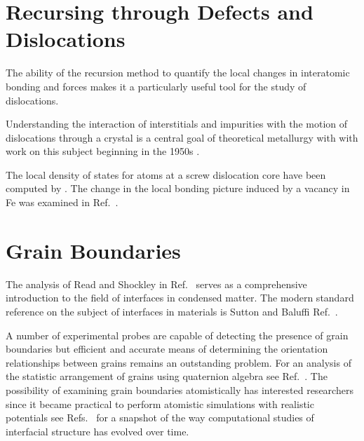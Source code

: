 
\section{Recursing through Defects and Dislocations}
The ability of the recursion method to quantify the local changes in interatomic bonding and
forces makes it a particularly useful tool for the study of dislocations. 

Understanding the interaction of interstitials and impurities with the motion of
dislocations through a crystal is a central goal of theoretical metallurgy with
with work on this subject beginning in the 1950s \cite{cochardt55}.

The local density of states for atoms at a screw dislocation core have been computed by \cite{paidar81,masuda81}. 
The change in the local bonding picture induced by a vacancy in Fe was examined in Ref.~\cite{masuda82,ohta87}.

\section{Grain Boundaries}
The analysis of Read and Shockley in Ref.~\cite{read50} serves as a comprehensive
introduction to the field of interfaces in condensed matter. The modern
standard reference on the subject of interfaces in materials is Sutton and 
Baluffi Ref.~\cite{sutton95}.

A number of experimental probes are capable of detecting the presence of 
grain boundaries but efficient and accurate means of determining 
the orientation relationships between grains remains an outstanding problem.
For an analysis of the statistic arrangement of grains using quaternion
algebra see Ref.~\cite{sutton96}.
The possibility of examining grain boundaries atomistically has interested
researchers since it became practical to perform atomistic simulations
with realistic potentials see Refs.~\cite{bristowe75,wolf83,paxton87,paxton88,paxtonsutton88,
kohyama88,kohyama94,paxton96,rittner96,tschopp07,momida13,du11,du12,mceniry18} for a
snapshot of the way computational studies of interfacial structure 
has evolved over time.

